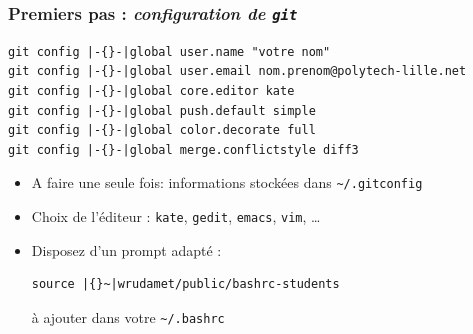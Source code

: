 \documentclass[table,tikz,12pt,svgnames]{beamer}
\begin{document}
\begin{frame}[fragile]
\frametitle{Premiers pas : \textit{configuration de \texttt{git}}}
\begin{adjustwidth}{1em}{0cm}{}
\begin{verbatim}
git config |-{}-|global user.name "votre nom"
git config |-{}-|global user.email nom.prenom@polytech-lille.net
git config |-{}-|global core.editor kate
git config |-{}-|global push.default simple
git config |-{}-|global color.decorate full
git config |-{}-|global merge.conflictstyle diff3
\end{verbatim}
\end{adjustwidth}
\vspace{-1em}
\begin{block}{}
\begin{itemize}
\item A faire une seule fois: informations stockées dans \texttt{\textasciitilde/.gitconfig}
\item Choix de l’éditeur : \texttt{kate}, \texttt{gedit}, \texttt{emacs}, \texttt{vim}, \ldots
\item Disposez d’un prompt adapté :
\begin{verbatim}
source |{}~|wrudamet/public/bashrc-students
\end{verbatim}
\small à ajouter dans votre \texttt{\textasciitilde/.bashrc}
\end{itemize}
\end{block}

\end{frame}
\end{document}
